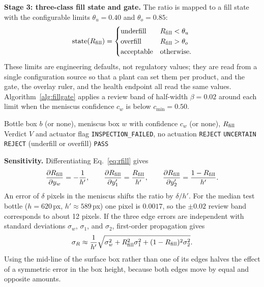 \noindent\textbf{Stage 3: three-class fill state and gate.} The ratio is mapped to a fill state with the configurable limits $\theta_u=0.40$ and $\theta_o=0.85$:
\begin{equation}
    \text{state}(R_{\mathrm{fill}}) = \begin{cases}
    \text{underfill} & R_{\mathrm{fill}}<\theta_u\\
    \text{overfill} & R_{\mathrm{fill}}>\theta_o\\
    \text{acceptable} & \text{otherwise.}
    \end{cases}
    \label{eq:fillstate}
\end{equation}
These limits are engineering defaults, not regulatory values; they are read from a single configuration source so that a plant can set them per product, and the gate, the overlay ruler, and the health endpoint all read the same values. Algorithm~\ref{alg:fillgate} applies a review band of half-width $\beta=0.02$ around each limit when the meniscus confidence $c_w$ is below $c_{\min}=0.50$.

\begin{algorithm}[htbp]
\caption{Fill gate}
\label{alg:fillgate}
\begin{algorithmic}[1]
\Require Bottle box $b$ (or none), meniscus box $w$ with confidence $c_w$ (or none), $R_{\mathrm{fill}}$
\Ensure Verdict $V$ and actuator flag
    \State \Return \texttt{INSPECTION\_FAILED}, no actuation 
    \State \Return \texttt{REJECT} 
    \State \Return \texttt{UNCERTAIN} 
    \State \Return \texttt{REJECT} (underfill or overfill)
\Else
    \State \Return \texttt{PASS}
\EndIf
\end{algorithmic}
\end{algorithm}

\noindent\textbf{Sensitivity.} Differentiating Eq.~\eqref{eq:rfill} gives
\begin{equation}
    \frac{\partial R_{\mathrm{fill}}}{\partial y_w} = -\frac{1}{h'},\qquad
    \frac{\partial R_{\mathrm{fill}}}{\partial y'_1} = \frac{R_{\mathrm{fill}}}{h'},\qquad
    \frac{\partial R_{\mathrm{fill}}}{\partial y'_2} = \frac{1-R_{\mathrm{fill}}}{h'}.
    \label{eq:sens}
\end{equation}
An error of $\delta$ pixels in the meniscus shifts the ratio by $\delta/h'$. For the median test bottle ($h=620$\,px, $h'\approx589$\,px) one pixel is $0.0017$, so the $\pm0.02$ review band corresponds to about 12 pixels. If the three edge errors are independent with standard deviations $\sigma_w$, $\sigma_1$, and $\sigma_2$, first-order propagation gives
\begin{equation}
    \sigma_R \approx \frac{1}{h'}\sqrt{\sigma_w^2 + R_{\mathrm{fill}}^2\sigma_1^2 + (1-R_{\mathrm{fill}})^2\sigma_2^2}.
    \label{eq:prop}
\end{equation}
Using the mid-line of the surface box rather than one of its edges halves the effect of a symmetric error in the box height, because both edges move by equal and opposite amounts.

